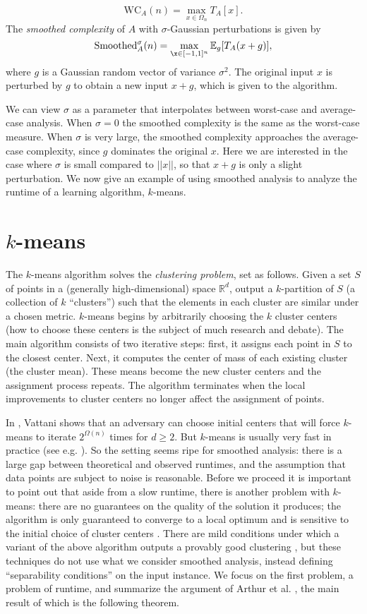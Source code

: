 \documentclass[11pt]{article}
\theoremstyle{definition}
\begin{document}
$$\mbox{WC}_A(n) = \max_{x \in \Omega_n}T_A[x].$$
The \emph{smoothed complexity} of $A$ with $\sigma$-Gaussian perturbations is given by
$$\mbox{Smoothed}_A^{\sigma}(n) = \max_{\x\in [-1,1]^n}
\mathbb{E}_g[T_A(x + g)],$$ where $g$ is a Gaussian random vector of
variance $\sigma^2$. The original input $x$ is perturbed by $g$ to
obtain a new input $x + g$, which is given to the algorithm.

We can view $\sigma$ as a parameter that interpolates between
worst-case and average-case analysis. When $\sigma = 0$ the smoothed
complexity is the same as the worst-case measure. When $\sigma$ is
very large, the smoothed complexity approaches the average-case
complexity, since $g$ dominates the original $x$. Here we are
interested in the case where $\sigma$ is small compared to $||x||$, so
that $x + g$ is only a slight perturbation. We now give an example of
using smoothed analysis to analyze the runtime of a learning
algorithm, $k$-means.

\section{$k$-means}
The $k$-means algorithm solves the \emph{clustering problem}, set as
follows. Given a set $S$ of points in a (generally high-dimensional)
space $\mathbb{R}^d$, output a $k$-partition of $S$ (a collection of
$k$ ``clusters'') such that the elements in each cluster are similar
under a chosen metric. $k$-means begins by arbitrarily choosing the
$k$ cluster centers (how to choose these centers is the subject of
much research and debate). The main algorithm consists of two
iterative steps: first, it assigns each point in $S$ to the closest
center. Next, it computes the center of mass of each existing cluster
(the cluster mean). These means become the new cluster centers and the
assignment process repeats. The algorithm terminates when the local
improvements to cluster centers no longer affect the assignment of
points.

In \cite{KMworstcase}, Vattani shows that an adversary can choose
initial centers that will force $k$-means to iterate $2^{\Omega(n)}$
times for $d \ge 2$. But $k$-means is usually very fast in practice
(see e.g. \cite{kmeansfast}). So the setting seems ripe for smoothed
analysis: there is a large gap between theoretical and observed
runtimes, and the assumption that data points are subject to noise is
reasonable. Before we proceed it is important to point out that aside
from a slow runtime, there is another problem with $k$-means: there
are no guarantees on the quality of the solution it produces; the
algorithm is only guaranteed to converge to a local optimum and is
sensitive to the initial choice of cluster centers
\cite{kmeanssensitive}. There are mild conditions under which a
variant of the above algorithm outputs a provably good clustering
\cite{kmeansprovable}, but these techniques do not use what we
consider smoothed analysis, instead defining ``separability
conditions'' on the input instance. We focus on the first problem, a
problem of runtime, and summarize the argument of Arthur et
al. \cite{SAkmeans}, the main result of which is the following
theorem.
\end{document}
